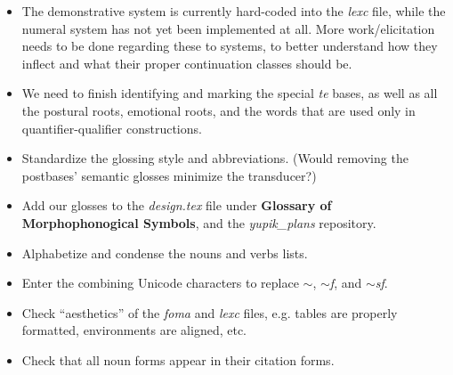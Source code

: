 \documentclass{article}
\begin{document}
\begin{itemize}
\renewcommand\labelitemi{$\cdot$}

\item The demonstrative system is currently hard-coded into the \textit{lexc} file, while the numeral system has not yet been implemented at all.
%
More work/elicitation needs to be done regarding these to systems, to better understand how they inflect and what their proper continuation classes should be.

\item We need to finish identifying and marking the special \textit{te} bases, as well as all the postural roots, emotional roots, and the words that are used only in quantifier-qualifier constructions.

\item Standardize the glossing style and abbreviations.
%
(Would removing the postbases' semantic glosses minimize the transducer?)

\item Add our glosses to the \textit{design.tex} file under \textbf{Glossary of Morphophonogical Symbols}, and the \textit{yupik\_plans} repository.

\item Alphabetize and condense the nouns and verbs lists.

\item Enter the combining Unicode characters to replace \textit{$\sim$}, \textit{$\sim$f}, and \textit{$\sim$sf}.

\item Check ``aesthetics'' of the \textit{foma} and \textit{lexc} files, e.g. tables are properly formatted, environments are aligned, etc.

\item Check that all noun forms appear in their citation forms.

\end{itemize}
\end{document}
